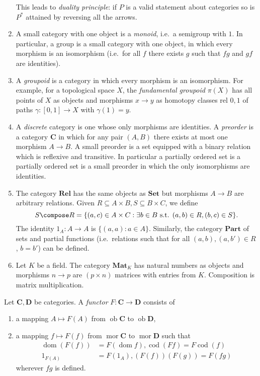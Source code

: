 \documentclass[a4paper]{article}
\renewcommand{\c}[1]{\mathbf{#1}}
\DeclareMathOperator{\ob}{ob}
\DeclareMathOperator{\mor}{mor}
\DeclareMathOperator{\dom}{dom}
\DeclareMathOperator{\cod}{cod}
\newcommand{\Set}{{\c{Set}}}
\newcommand{\Rel}{{\c{Rel}}}
\begin{document}
\begin{eg}
\begin{enumerate}
    This leads to \emph{duality principle}: if \(P\) is a valid statement about categories so is \(P^*\) attained by reversing all the arrows.
  \item A small category with one object is a \emph{monoid}, i.e.\ a semigroup with \(1\). In particular, a group is a small category with one object, in which every morphism is an isomorphism (i.e.\ for all \(f\) there exists \(g\) such that \(fg\) and \(gf\) are identities).
  \item A \emph{groupoid} is a category in which every morphism is an isomorphism. For example, for a topological space \(X\), the \emph{fundamental groupoid} \(\pi(X)\) has all points of \(X\) as objects and morphisms \(x \to y\) as homotopy classes rel \({0, 1}\) of paths \(\gamma: [0, 1] \to X\) with \(\gamma(1) = y\).
  \item A \emph{discrete} category is one whose only morphisms are identities. A \emph{preorder} is a category \(\c C\) in which for any pair \((A, B)\) there exists at most one morphism \(A \to B\). A small preorder is a set equipped with a binary relation which is reflexive and transitive. In particular a partially ordered set is a partially ordered set is a small preorder in which the only isomorphisms are identities.
  \item The category \(\Rel\) has the same objects as \(\Set\) but morphisms \(A \to B\) are arbitrary relations. Given \(R \subseteq A \times B, S \subseteq B \times C\), we define
    \[
      S \compose R = \{(a, c) \in A \times C: \exists b \in B \text{ s.t. } (a, b) \in R, (b, c) \in S\}.
    \]
    The identity \(1_A: A \to A\) is \(\{(a, a): a \in A\}\). Similarly, the category \(\c{Part}\) of sets and partial functions (i.e.\ relations such that for all \((a, b), (a, b') \in R\), \(b = b'\)) can be defined.
  \item Let \(K\) be a field. The category \(\c{Mat}_K\) has natural numbers as objects and morphisms \(n \to p\) are \((p \times n)\) matrices with entries from \(K\). Composition is matrix multiplication.
  \end{enumerate}
\end{eg}

\begin{definition}[functor]
  Let \(\c C, \c D\) be categories. A \emph{functor} \(F: \c C \to \c D\) consists of
  \begin{enumerate}
  \item a mapping \(A \mapsto F(A)\) from \(\ob \c C\) to \(\ob \c D\),
  \item a mapping \(f \mapsto F(f)\) from \(\mor \c C\) to \(\mor \c D\) such that
    \begin{align*}
      \dom(F(f)) &= F(\dom f), \cod (Ff) = F \cod(f) \\
      1_{F(A)} &= F(1_A), (F(f))(F(g)) = F(fg)
    \end{align*}
    wherever \(fg\) is defined.
  \end{enumerate}
\end{definition}
\end{document}
